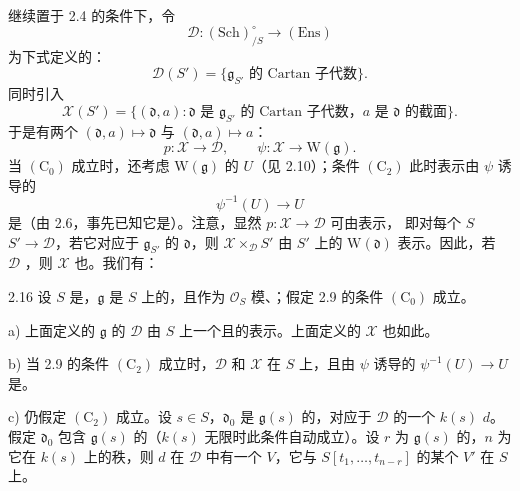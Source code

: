 继续置于 2.4 的条件下，令
\[\mathcal D:(\mathrm{Sch})_{/S}^{\circ}\longrightarrow(\mathrm{Ens})\]
为下式定义的：
\[\mathcal D(S')=\{\mathfrak g_{S'}\text{ 的 Cartan 子代数}\}.\]
同时引入
\[\mathcal X(S')=\{(\mathfrak d,a):\mathfrak d\text{ 是 }\mathfrak g_{S'}\text{ 的 Cartan 子代数，}
 a\text{ 是 }\mathfrak d\text{ 的截面}\}.\]
于是有两个 $(\mathfrak d,a)\mapsto\mathfrak d$ 与 $(\mathfrak d,a)\mapsto a$：
\[p:\mathcal X\longrightarrow\mathcal D,\qquad
\psi:\mathcal X\longrightarrow\mathrm W(\mathfrak g).\]
当 $(\mathrm C_0)$ 成立时，还考虑 $\mathrm W(\mathfrak g)$ 的 $U$（见 2.10）；条件 $(\mathrm C_2)$ 此时表示由 $\psi$ 诱导的
\[\psi^{-1}(U)\longrightarrow U\]
是（由 2.6，事先已知它是）。注意，显然 $p:\mathcal X\to\mathcal D$ 可由表示，
即对每个 $S$  $S'\to\mathcal D$，若它对应于 $\mathfrak g_{S'}$ 的 $\mathfrak d$，则 $\mathcal X\times_{\mathcal D}S'$ 由 $S'$ 上的 $\mathrm W(\mathfrak d)$ 表示。因此，若 $\mathcal D$ ，则 $\mathcal X$ 也。我们有：
\begin{SGAresult}{}{2.16}
设 $S$ 是，$\mathfrak g$ 是 $S$ 上的，且作为 $\mathcal O_S$ 模、；假定 2.9 的条件 $(\mathrm C_0)$ 成立。

a) 上面定义的 $\mathfrak g$ 的 $\mathcal D$ 由 $S$ 上一个且的表示。上面定义的 $\mathcal X$ 也如此。

b) 当 2.9 的条件 $(\mathrm C_2)$ 成立时，$\mathcal D$ 和 $\mathcal X$ 在 $S$ 上，且由 $\psi$ 诱导的 $\psi^{-1}(U)\to U$ 是。

c) 仍假定 $(\mathrm C_2)$ 成立。设 $s\in S$，$\mathfrak d_0$ 是 $\mathfrak g(s)$ 的，对应于 $\mathcal D$ 的一个 $k(s)$  $d$。假定 $\mathfrak d_0$ 包含 $\mathfrak g(s)$ 的（$k(s)$ 无限时此条件自动成立）。设 $r$ 为 $\mathfrak g(s)$ 的，$n$ 为它在 $k(s)$ 上的秩，则 $d$ 在 $\mathcal D$ 中有一个 $V$，它与 $S[t_1,\ldots,t_{n-r}]$ 的某个 $V'$ 在 $S$ 上。
\end{SGAresult}
